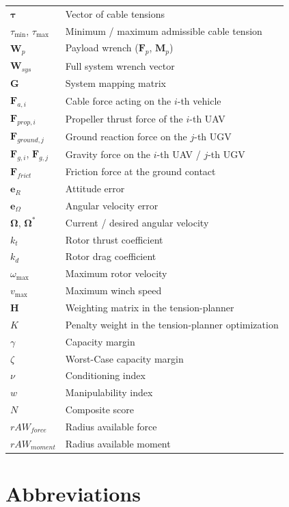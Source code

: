 \begin{tabularx}{\linewidth}{@{} l X @{}}
$\boldsymbol{\tau}$ & Vector of cable tensions \\
$\tau_{\min}$, $\tau_{\max}$ & Minimum / maximum admissible cable tension \\
$\mathbf{W}_p$ & Payload wrench ($\mathbf{F}_p$, $\mathbf{M}_p$) \\
$\mathbf{W}_{sys}$ & Full system wrench vector \\
$\mathbf{G}$ & System mapping matrix \\
$\mathbf{F}_{a,i}$ & Cable force acting on the $i$-th vehicle \\
$\mathbf{F}_{prop,i}$ & Propeller thrust force of the $i$-th UAV \\
$\mathbf{F}_{ground,j}$ & Ground reaction force on the $j$-th UGV \\
$\mathbf{F}_{g,i}$, $\mathbf{F}_{g,j}$ & Gravity force on the $i$-th UAV / $j$-th UGV \\
$\mathbf{F}_{frict}$ & Friction force at the ground contact \\

$\mathbf{e}_R$ & Attitude error \\
$\mathbf{e}_\Omega$ & Angular velocity error \\
$\boldsymbol{\Omega}$, $\boldsymbol{\Omega}^*$ & Current / desired angular velocity \\
$k_t$ & Rotor thrust coefficient \\
$k_d$ & Rotor drag coefficient \\
$\omega_{\max}$ & Maximum rotor velocity \\
$v_{\max}$ & Maximum winch speed \\
$\mathbf{H}$ & Weighting matrix in the tension-planner \\
$K$ & Penalty weight in the tension-planner optimization \\

$\gamma$ & Capacity margin \\
$\zeta$ & Worst-Case capacity margin \\
$\nu$ & Conditioning index \\
$w$ & Manipulability index \\
$N$ & Composite score \\
$rAW_{force}$ & Radius available force \\
$rAW_{moment}$ & Radius available moment 
\end{tabularx}


\raggedbottom
\newpage
 
\section*{Abbreviations}

